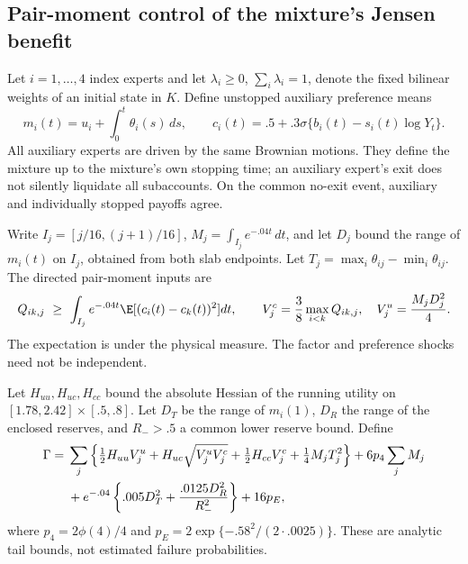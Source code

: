 \subsection{Pair-moment control of the mixture's Jensen benefit}
Let $i=1,\ldots,4$ index experts and let $\lambda_i\geq0$, $\sum_i\lambda_i=1$, denote the fixed bilinear weights of an initial state in $K$. Define unstopped auxiliary preference means
\[
 m_i(t)=u_i+\int_0^t\theta_i(s)\,ds,
 \qquad c_i(t)=.5+.3\sigma\{b_i(t)-s_i(t)\log Y_t\}.
\]
All auxiliary experts are driven by the same Brownian motions. They define the mixture up to the mixture's own stopping time; an auxiliary expert's exit does not silently liquidate all subaccounts. On the common no-exit event, auxiliary and individually stopped payoffs agree.

Write $I_j=[j/16,(j+1)/16]$, $M_j=\int_{I_j}e^{-.04t}\,dt$, and let $D_j$ bound the range of $m_i(t)$ on $I_j$, obtained from both slab endpoints. Let $T_j=\max_i\theta_{ij}-\min_i\theta_{ij}$. The directed pair-moment inputs are
\begin{equation}
 Q_{ik,j}\ \geq\ \int_{I_j}e^{-.04t}\E[(c_i(t)-c_k(t))^2]dt,
 \qquad V_j^c=\frac38\max_{i<k}Q_{ik,j},\quad V_j^u=\frac{M_jD_j^2}{4}.
 \label{eq:r22moments}
\end{equation}
The expectation is under the physical measure. The factor and preference shocks need not be independent.

Let $H_{uu},H_{uc},H_{cc}$ bound the absolute Hessian of the running utility on $[1.78,2.42]\times[.5,.8]$. Let $D_T$ be the range of $m_i(1)$, $D_R$ the range of the enclosed reserves, and $R_->.5$ a common lower reserve bound. Define
\begin{align}
 \Gamma={}&\sum_j\left\{\tfrac12H_{uu}V_j^u+H_{uc}\sqrt{V_j^uV_j^c}
       +\tfrac12H_{cc}V_j^c+\tfrac14M_jT_j^2\right\}
       +6p_4\sum_jM_j\notag\\
 &+e^{-.04}\left\{.005D_T^2+\frac{.0125D_R^2}{R_-^2}\right\}+16p_E,
 \label{eq:r22gamma}
\end{align}
where $p_4=2\phi(4)/4$ and $p_E=2\exp\{- .58^2/(2\cdot .0025)\}$. These are analytic tail bounds, not estimated failure probabilities.

